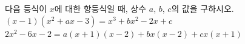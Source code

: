 다음 등식이 $x$에 대한 항등식일 때, 상수 $a$, $b$, $c$의 값을 구하시오.
 $(x-1)(x^2+ax-3)=x^3+bx^2-2x+c$
 $2x^2-6x-2=a(x+1)(x-2)+bx(x-2)+cx(x+1)$
